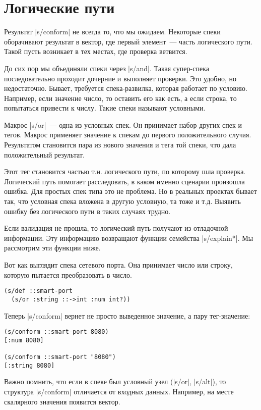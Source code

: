 \section{Логические пути}

Результат \spverb|s/conform| не всегда то, что мы ожидаем. Некоторые спеки оборачивают
результат в вектор, где первый элемент~--- часть логического пути. Такой пусть
возникает в тех местах, где проверка ветвится.

До сих пор мы объединяли спеки через \spverb|s/and|. Такая супер-спека последовательно
проходит дочерние и выполняет проверки. Это удобно, но недостаточно. Бывает,
требуется спека-развилка, которая работает по условию. Например, если значение
число, то оставить его как есть, а если строка, то попытаться привести к
числу. Такие спеки называют условными.

Макрос \spverb|s/or|~--- одна из условных спек. Он принимает набор других спек и
тегов. Макрос применяет значение к спекам до первого положительного
случая. Результатом становится пара из нового значения и тега той спеки, что
дала положительный результат.

Этот тег становится частью т.н. логического пути, по которому шла
проверка. Логический путь помогает расследовать, в каком именно сценарии
произошла ошибка. Для простых спек типа это не проблема. Но в реальных проектах
бывает так, что условная спека вложена в другую условную, та тоже и т.д. Выявить
ошибку без логического пути в таких случаях трудно.

Если валидация не прошла, то логический путь получают из отладочной
информации. Эту информацию возвращают функции семейства \spverb|s/explain*|. Мы
рассмотрим эти функции ниже.

Вот как выглядит спека сетевого порта. Она принимает число или строку, которую
пытается преобразовать в число.

\begin{verbatim}
(s/def ::smart-port
  (s/or :string ::->int :num int?))
\end{verbatim}

Теперь \spverb|s/conform| вернет не просто выведенное значение, а пару тег-значение:

\begin{verbatim}
(s/conform ::smart-port 8080)
[:num 8080]

(s/conform ::smart-port "8080")
[:string 8080]
\end{verbatim}

Важно помнить, что если в спеке был условный узел (\spverb|s/or|, \spverb|s/alt|), то
структура \spverb|s/conform| отличается от входных данных. Например, на месте
скалярного значения появится вектор.

